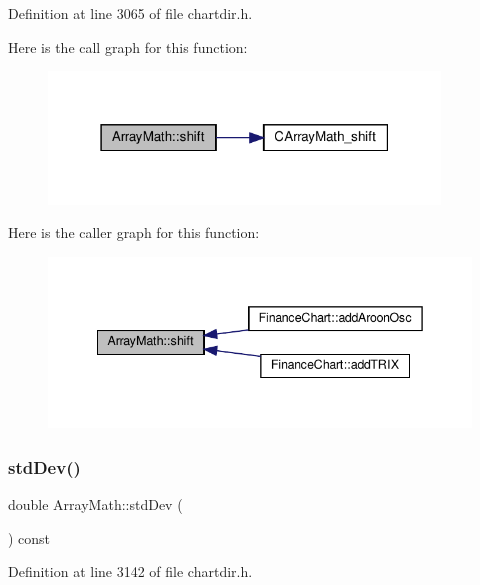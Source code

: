 Definition at line 3065 of file chartdir.\+h.

Here is the call graph for this function\+:
\nopagebreak
\begin{figure}[H]
\begin{center}
\leavevmode
\includegraphics[width=295pt]{class_array_math_a3448f6c81db45f84e63351a00f6d32b3_cgraph}
\end{center}
\end{figure}
Here is the caller graph for this function\+:
\nopagebreak
\begin{figure}[H]
\begin{center}
\leavevmode
\includegraphics[width=342pt]{class_array_math_a3448f6c81db45f84e63351a00f6d32b3_icgraph}
\end{center}
\end{figure}
\mbox{\label{class_array_math_a71fbcf5d93c40e840b4aa7fbea38e98e}} 
\subsubsection{\texorpdfstring{std\+Dev()}{stdDev()}}
{\footnotesize\ttfamily double Array\+Math\+::std\+Dev (\begin{DoxyParamCaption}{ }\end{DoxyParamCaption}) const\hspace{0.3cm}{\ttfamily [inline]}}



Definition at line 3142 of file chartdir.\+h.

